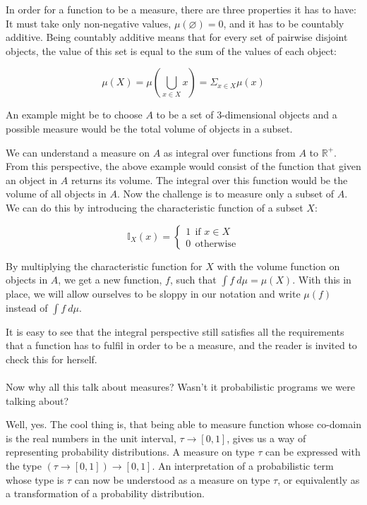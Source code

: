 \documentclass[11pt, leqno, titlepage]{article}
\theoremstyle{definition}
\begin{document}
In order for a function to be a measure, there are three properties it has to have:
It must take only non-negative values, $\mu (\varnothing) = 0$, and it has to be
countably additive. Being countably additive means that for every set of pairwise
disjoint objects, the value of this set is equal to the sum of the values of each
object:

\begin{equation*}
  \mu (X) = \mu(\bigcup_{x\in X} x) = \Sigma_{x\in X} \mu (x)
\end{equation*}

An example might be to choose $A$ to be a set of 3-dimensional objects and a possible
measure would be the total volume of objects in a subset. 

 We can understand a measure on $A$ as integral
over functions from $A$ to $\mathbb{R}^+$. From this perspective, the above example
would consist of the function that given an object in $A$ returns its volume. The
integral over this function would be the volume of all objects in $A$. Now the
challenge is to measure only a subset of $A$. We can do this by introducing the
characteristic function of a subset $X$:%

$$\mathbb{I}_X(x)=
\begin{cases}
  1~~\text{if }x\in X\\
  0~~\text{otherwise}
\end{cases}$$

By multiplying the characteristic function for $X$ with the volume function on
objects in $A$, we get a new function, $f$, such that $\int f~d\mu = \mu(X)$. With
this in place, we will allow ourselves to be sloppy in our notation and write
$\mu(f)$ instead of $\int f~d\mu$.

It is easy to see that the integral perspective still satisfies all the requirements
that a function has to fulfil in order to be a measure, and the reader is invited to
check this for herself.\\
\\
Now why all this talk about measures? Wasn't it probabilistic programs we were
talking about?

Well, yes. The cool thing is, that being able to measure function whose co-domain is
the real numbers in the unit interval, $\tau\to[0,1]$, gives us a way of representing
probability distributions. A measure on type $\tau$ can be expressed with the type
$(\tau\to[0,1])\to[0,1]$. An interpretation of a probabilistic term whose type is
$\tau$ can now be understood as a measure on type $\tau$, or equivalently as a
transformation of a probability distribution.
\end{document}
